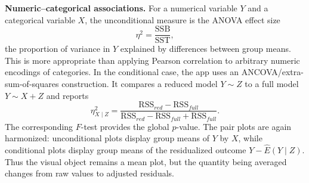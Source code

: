 \documentclass[preprint,12pt,a4paper]{elsarticle}
\numberwithin{equation}{section}
\begin{document}
\textbf{Numeric--categorical associations.} For a numerical variable $Y$ and a categorical variable $X$, the unconditional measure is the ANOVA effect size
\begin{equation}
\eta^2=\frac{\mathrm{SSB}}{\mathrm{SST}},
\label{eq:eta2-main}
\end{equation}
the proportion of variance in $Y$ explained by differences between group means. This is more appropriate than applying Pearson correlation to arbitrary numeric encodings of categories. In the conditional case, the app uses an ANCOVA/extra-sum-of-squares construction. It compares a reduced model $Y\sim Z$ to a full model $Y\sim X+Z$ and reports
\begin{equation}
\eta^2_{X\mid Z}=
\frac{\mathrm{RSS}_{red}-\mathrm{RSS}_{full}}
{\mathrm{RSS}_{red}-\mathrm{RSS}_{full}+\mathrm{RSS}_{full}}.
\label{eq:eta2z-main}
\end{equation}
The corresponding $F$-test provides the global $p$-value. The pair plots are again harmonized: unconditional plots display group means of $Y$ by $X$, while conditional plots display group means of the residualized outcome $Y-\widehat{E}(Y\mid Z)$. Thus the visual object remains a mean plot, but the quantity being averaged changes from raw values to adjusted residuals.
\end{document}
